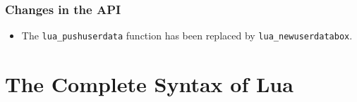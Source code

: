 \documentclass[11pt,twoside,draft]{article}
\renewcommand{\Or}{$|$ }
\begin{document}
\subsubsection*{Changes in the API}
\begin{itemize}

\item
The \verb|lua_pushuserdata| function has been replaced by
\verb|lua_newuserdatabox|.

\end{itemize}

\newpage
\section*{The Complete Syntax of Lua} \label{BNF}


\renewenvironment{Produc}{\vspace{0.8ex}\par\noindent\hspace{3ex}\it\begin{tabular}{rrl}}{\end{tabular}\vspace{0.8ex}\par\noindent}

\renewcommand{\OrNL}{\\ & \Or & }
\newcommand{\Nter}[1]{#1}

\end{document}
